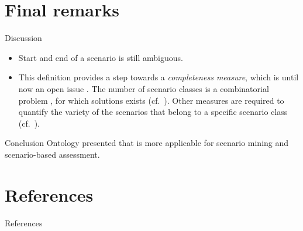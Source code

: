 \documentclass[aspectratio=\AspectR,10pt,compress,t]{beamer} %
\begin{document}
\section{Final remarks}
\begin{frame}{Discussion}
	\begin{itemize}
		\item Start and end of a scenario is still ambiguous.
		\item This definition provides a step towards a \emph{completeness measure}, which is until now an open issue \cite{geyer2014, alvarez2017prospective, stellet2015taxonomy}. The number of scenario classes is a combinatorial problem \cite{geyer2014}, for which solutions exists (cf.\ \cite{yang2012estimating, bunge1993estimating}). Other measures are required to quantify the variety of the scenarios that belong to a specific scenario class (cf.~\cite{wang2017much}).
	\end{itemize}
\end{frame}

\begin{frame}{Conclusion}
	Ontology presented that is more applicable for scenario mining and scenario-based assessment.
\end{frame}

\section{References}
\begin{frame}{References}
\end{frame}

\begin{frame}[allowframebreaks]
	
	\scriptsize
	
\end{frame}
\end{document}
